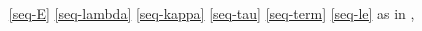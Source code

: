   \begin{multicols}{2}
    \begin{enumerate}[topsep=0pt,label=(\textsc{s}\arabic*),ref=\textsc{s}\arabic*]
    \item[\eqref{seq-E}]
      \eqref{seq-lambda}\;
      \eqref{seq-kappa}\;
      \eqref{seq-tau}\;
      \eqref{seq-term}\;
      \eqref{seq-le}\;
      as in ,
      \setcounter{enumi}{\value{le}}
    \item[]
      \begin{enumerate}[leftmargin=0pt]

\end{enumerate}
\end{enumerate}
\end{multicols}
